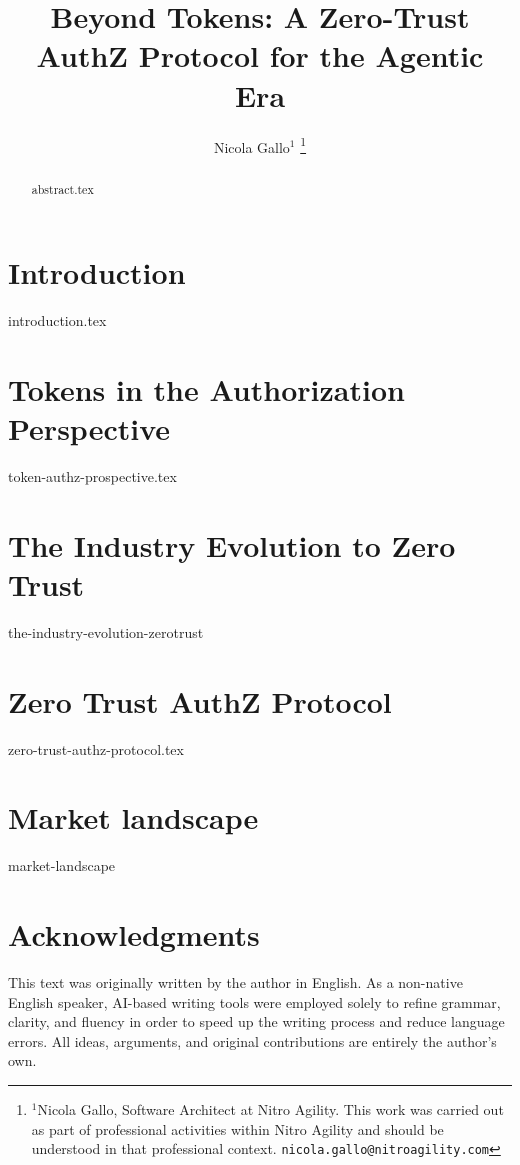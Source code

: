 \documentclass[letterpaper, 10 pt, conference]{ieeeconf}  %
\title{\LARGE \bf
Beyond Tokens: A Zero-Trust AuthZ Protocol for the Agentic Era
}
\author{Nicola Gallo$^{1}$%
\thanks{$^{1}$Nicola Gallo, Software Architect at Nitro Agility. 
This work was carried out as part of professional activities within Nitro Agility and should be understood in that professional context. 
{\tt\small nicola.gallo@nitroagility.com}}%
}
\begin{document}
\maketitle
\thispagestyle{empty}
\pagestyle{empty}

\begin{abstract}
{abstract.tex}
\end{abstract}

\section{Introduction}
\label{sec:introduction}
{introduction.tex}

\section{Tokens in the Authorization Perspective}
\label{sec:token-authz-prospective}
{token-authz-prospective.tex}

\section{The Industry Evolution to Zero Trust}
\label{sec:the-industry-evolution-zerotrust}
{the-industry-evolution-zerotrust}

\section{Zero Trust AuthZ Protocol}
\label{sec:zero-trust-authz-protocol}
{zero-trust-authz-protocol.tex}

\section{Market landscape}
\label{sec:market-landscape}
{market-landscape}

\section*{Acknowledgments}
This text was originally written by the author in English. 
As a non-native English speaker, AI-based writing tools were employed solely to refine grammar, clarity, and fluency in order to speed up the writing process and reduce language errors.
All ideas, arguments, and original contributions are entirely the author's own.
\end{document}
